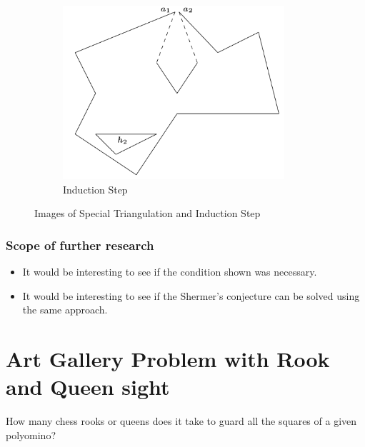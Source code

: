 \documentclass{Assignment}
\begin{document}
\begin{itemize}
\begin{figure}[H]
\begin{minipage}{0.45\textwidth}
\begin{subfigure}[b]{\textwidth}
                \includegraphics[width=0.9\textwidth]{images/induction_step.png}
                \caption{Induction Step}
                \label{fig:induction_step}
            \end{subfigure}
        \end{minipage}
        \caption{Images of Special Triangulation and Induction Step}
    \end{figure}
\end{itemize}
\vspace{-0.8cm}
\subsubsection*{Scope of further research}
\vspace{-0.3cm}
\begin{itemize}
    \itemsep-0.3em
    \item It would be interesting to see if the condition shown was necessary.
    \item It would be interesting to see if the Shermer's conjecture can be solved using the same approach.
\end{itemize}
\vspace{-0.7cm}
\section*{Art Gallery Problem with Rook and Queen sight\supercite{queen_and_rook_vision}}
\begin{problem}
    How many chess rooks or queens does it take to guard all the squares of a given polyomino?
\end{problem}
\vspace{-0.8cm}
\end{document}
